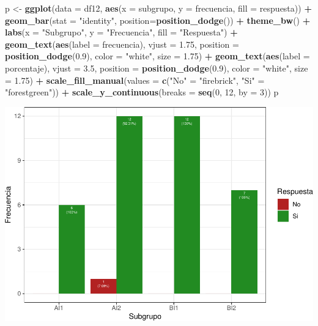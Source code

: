 \documentclass[
]{article}
\newenvironment{Shaded}{\begin{snugshade}}{\end{snugshade}}
\newcommand{\AttributeTok}[1]{\textcolor[rgb]{0.13,0.29,0.53}{#1}}
\newcommand{\DecValTok}[1]{\textcolor[rgb]{0.00,0.00,0.81}{#1}}
\newcommand{\FloatTok}[1]{\textcolor[rgb]{0.00,0.00,0.81}{#1}}
\newcommand{\FunctionTok}[1]{\textcolor[rgb]{0.13,0.29,0.53}{\textbf{#1}}}
\newcommand{\NormalTok}[1]{#1}
\newcommand{\OtherTok}[1]{\textcolor[rgb]{0.56,0.35,0.01}{#1}}
\newcommand{\SpecialCharTok}[1]{\textcolor[rgb]{0.81,0.36,0.00}{\textbf{#1}}}
\newcommand{\StringTok}[1]{\textcolor[rgb]{0.31,0.60,0.02}{#1}}
\begin{document}
\begin{Shaded}
\begin{Highlighting}[]
\NormalTok{p }\OtherTok{\textless{}{-}} \FunctionTok{ggplot}\NormalTok{(}\AttributeTok{data =}\NormalTok{ df12, }\FunctionTok{aes}\NormalTok{(}\AttributeTok{x =}\NormalTok{ subgrupo, }\AttributeTok{y =}\NormalTok{ frecuencia, }\AttributeTok{fill =}\NormalTok{ respuesta)) }\SpecialCharTok{+} 
  \FunctionTok{geom\_bar}\NormalTok{(}\AttributeTok{stat =} \StringTok{"identity"}\NormalTok{, }\AttributeTok{position=}\FunctionTok{position\_dodge}\NormalTok{()) }\SpecialCharTok{+}
  \FunctionTok{theme\_bw}\NormalTok{() }\SpecialCharTok{+} \FunctionTok{labs}\NormalTok{(}\AttributeTok{x =} \StringTok{"Subgrupo"}\NormalTok{, }\AttributeTok{y =} \StringTok{"Frecuencia"}\NormalTok{, }\AttributeTok{fill =} \StringTok{"Respuesta"}\NormalTok{) }\SpecialCharTok{+}
  \FunctionTok{geom\_text}\NormalTok{(}\FunctionTok{aes}\NormalTok{(}\AttributeTok{label =}\NormalTok{ frecuencia), }\AttributeTok{vjust =} \FloatTok{1.75}\NormalTok{, }\AttributeTok{position =} \FunctionTok{position\_dodge}\NormalTok{(}\FloatTok{0.9}\NormalTok{), }
            \AttributeTok{color =} \StringTok{"white"}\NormalTok{, }\AttributeTok{size =} \FloatTok{1.75}\NormalTok{) }\SpecialCharTok{+}
  \FunctionTok{geom\_text}\NormalTok{(}\FunctionTok{aes}\NormalTok{(}\AttributeTok{label =}\NormalTok{ porcentaje), }\AttributeTok{vjust =} \FloatTok{3.5}\NormalTok{, }\AttributeTok{position =} \FunctionTok{position\_dodge}\NormalTok{(}\FloatTok{0.9}\NormalTok{), }
            \AttributeTok{color =} \StringTok{"white"}\NormalTok{, }\AttributeTok{size =} \FloatTok{1.75}\NormalTok{) }\SpecialCharTok{+}
  \FunctionTok{scale\_fill\_manual}\NormalTok{(}\AttributeTok{values =} \FunctionTok{c}\NormalTok{(}\StringTok{"No"} \OtherTok{=} \StringTok{"firebrick"}\NormalTok{, }\StringTok{"Si"} \OtherTok{=} \StringTok{"forestgreen"}\NormalTok{)) }\SpecialCharTok{+}
  \FunctionTok{scale\_y\_continuous}\NormalTok{(}\AttributeTok{breaks =} \FunctionTok{seq}\NormalTok{(}\DecValTok{0}\NormalTok{, }\DecValTok{12}\NormalTok{, }\AttributeTok{by =} \DecValTok{3}\NormalTok{))}
\NormalTok{p}
\end{Highlighting}
\end{Shaded}

\includegraphics{informe_files/figure-latex/unnamed-chunk-13-1.pdf}
\end{document}
